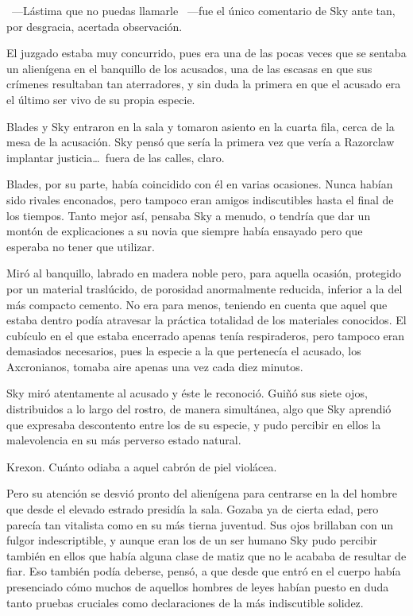 ~---Lástima que no puedas llamarle ~---fue el único comentario de Sky ante tan, por desgracia, acertada observación.

El juzgado estaba muy concurrido, pues era una de las pocas veces que se sentaba un alienígena en el banquillo de los acusados, una de las escasas en que sus crímenes resultaban tan aterradores, y sin duda la primera en que el acusado era el último ser vivo de su propia especie.

Blades y Sky entraron en la sala y tomaron asiento en la cuarta fila, cerca de la mesa de la acusación. Sky pensó que sería la primera vez que vería a Razorclaw implantar justicia\dots\ fuera de las calles, claro.

Blades, por su parte, había coincidido con él en varias ocasiones. Nunca habían sido rivales enconados, pero tampoco eran amigos indiscutibles hasta el final de los tiempos. Tanto mejor así, pensaba Sky a menudo, o tendría que dar un montón de explicaciones a su novia que siempre había ensayado pero que esperaba no tener que utilizar.

Miró al banquillo, labrado en madera noble pero, para aquella ocasión, protegido por un material traslúcido, de porosidad anormalmente reducida, inferior a la del más compacto cemento. No era para menos, teniendo en cuenta que aquel que estaba dentro podía atravesar la práctica totalidad de los materiales conocidos. El cubículo en el que estaba encerrado apenas tenía respiraderos, pero tampoco eran demasiados necesarios, pues la especie a la que pertenecía el acusado, los Axcronianos, tomaba aire apenas una vez cada diez minutos.

Sky miró atentamente al acusado y éste le reconoció. Guiñó sus siete ojos, distribuidos a lo largo del rostro, de manera simultánea, algo que Sky aprendió que expresaba descontento entre los de su especie, y pudo percibir en ellos la malevolencia en su más perverso estado natural.

Krexon. Cuánto odiaba a aquel cabrón de piel violácea.

Pero su atención se desvió pronto del alienígena para centrarse en la del hombre que desde el elevado estrado presidía la sala. Gozaba ya de cierta edad, pero parecía tan vitalista como en su más tierna juventud. Sus ojos brillaban con un fulgor indescriptible, y aunque eran los de un ser humano Sky pudo percibir también en ellos que había alguna clase de matiz que no le acababa de resultar de fiar. Eso también podía deberse, pensó, a que desde que entró en el cuerpo había presenciado cómo muchos de aquellos hombres de leyes habían puesto en duda tanto pruebas cruciales como declaraciones de la más indiscutible solidez.

